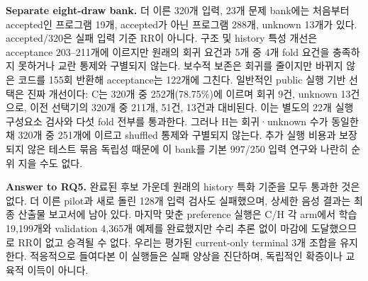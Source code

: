 \documentclass[10pt,conference]{IEEEtran}
\begin{document}
\noindent\textbf{Separate eight-draw bank.} 더 이른 320개 입력, 23개 문제 bank에는 처음부터 accepted인 프로그램 19개, accepted가 아닌 프로그램 288개, unknown 13개가 있다. accepted/320은 실패 입력 기준 RR이 아니다. 구조 및 history 특성 개선은 acceptance 203--211개에 이르지만 원래의 회귀 요건과 5개 중 4개 fold 요건을 충족하지 못하거나 교란 통제와 구별되지 않는다. 보수적 보존은 회귀를 줄이지만 바뀌지 않은 코드를 155회 반환해 acceptance는 122개에 그친다. 일반적인 public 실행 기반 선택은 진짜 개선이다: C는 320개 중 252개(78.75\%)에 이르며 회귀 9건, unknown 13건으로, 이전 선택기의 320개 중 211개, 51건, 13건과 대비된다. 이는 별도의 22개 실행 구성요소 검사와 다섯 fold 전부를 통과한다. 그러나 H는 회귀·unknown 수가 동일한 채 320개 중 251개에 이르고 shuffled 통제와 구별되지 않는다. 추가 실행 비용과 보장되지 않은 테스트 묶음 독립성 때문에 이 bank를 기본 997/250 입력 연구와 나란히 순위 지을 수도 없다.

\noindent\textbf{Answer to RQ5.} 완료된 후보 가운데 원래의 history 특화 기준을 모두 통과한 것은 없다. 더 이른 pilot과 새로 돌린 128개 입력 검사도 실패했으며, 상세한 음성 결과는 최종 산출물 보고서에 남아 있다. 마지막 맞춘 preference 실행은 C/H 각 arm에서 학습 19,199개와 validation 4,365개 예제를 완료했지만 수리 추론 없이 마감에 도달했으므로 RR이 없고 승격될 수 없다. 우리는 평가된 current-only terminal 3개 조합을 유지한다. 적응적으로 들여다본 이 실행들은 실패 양상을 진단하며, 독립적인 확증이나 교육적 이득이 아니다.
\end{document}
